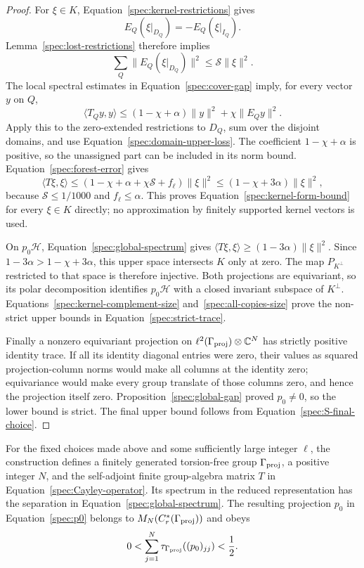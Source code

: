 \begin{proof}
For $\xi\in K$, Equation~\eqref{spec:kernel-restrictions} gives
\[
       E_Q(\xi|_{D_Q})=-E_Q(\xi|_{I_Q}).
\]
Lemma~\ref{spec:lost-restrictions} therefore implies
\begin{equation}
 \sum_Q\|E_Q(\xi|_{D_Q})\|^2\leq\mathcal S\|\xi\|^2.
 \label{spec:domain-upper-loss}
\end{equation}
The local spectral estimates in Equation~\eqref{spec:cover-gap} imply,
for every vector $y$ on $Q$,
\[
 \langle T_Qy,y\rangle
   \leq(1-\chi+\alpha)\|y\|^2+\chi\|E_Qy\|^2.
\]
Apply this to the zero-extended restrictions to $D_Q$, sum over the
disjoint domains, and use Equation~\eqref{spec:domain-upper-loss}.
The coefficient $1-\chi+\alpha$ is positive, so the unassigned part can
be included in its norm bound. Equation~\eqref{spec:forest-error} gives
\[
 \langle T\xi,\xi\rangle
 \leq(1-\chi+\alpha+\chi\mathcal S+f_\ell)\|\xi\|^2
 \leq(1-\chi+3\alpha)\|\xi\|^2,
\]
because $\mathcal S\leq1/1000$ and $f_\ell\leq\alpha$. This proves
Equation~\eqref{spec:kernel-form-bound} for every $\xi\in K$ directly;
no approximation by finitely supported kernel vectors is used.

On $p_0\mathcal H$, Equation~\eqref{spec:global-spectrum} gives
$\langle T\xi,\xi\rangle\geq(1-3\alpha)\|\xi\|^2$.
Since $1-3\alpha>1-\chi+3\alpha$, this upper space intersects $K$
only at zero. The map $P_{K^\perp}$ restricted to that space is
therefore injective. Both projections are equivariant, so its polar
decomposition identifies $p_0\mathcal H$ with a closed invariant
subspace of $K^\perp$. Equations~\eqref{spec:kernel-complement-size}
and~\eqref{spec:all-copies-size} prove the non-strict upper bounds in
Equation~\eqref{spec:strict-trace}.

Finally a nonzero equivariant projection on
$\ell^2(\Gamma_{\mathrm{proj}})\otimes\mathbb C^N$ has strictly positive identity
trace. If all its identity diagonal entries were zero, their values as
squared projection-column norms would make all columns at the identity
zero; equivariance would make every group translate of those columns
zero, and hence the projection itself zero. Proposition~\ref{spec:global-gap}
proved $p_0\ne0$, so the lower bound is strict. The final upper bound
follows from Equation~\eqref{spec:S-final-choice}.
\end{proof}

\begin{theorem}
\label{spec:matrix-projection}
For the fixed choices made above and some sufficiently large integer
$\ell$, the construction defines a finitely generated torsion-free
group $\Gamma_{\mathrm{proj}}$, a positive integer $N$, and the self-adjoint finite
group-algebra matrix $T$ in Equation~\eqref{spec:Cayley-operator}.  Its
spectrum in the reduced representation has the separation in
Equation~\eqref{spec:global-spectrum}.  The resulting projection $p_0$
in Equation~\eqref{spec:p0} belongs to $M_N(C_r^*(\Gamma_{\mathrm{proj}}))$ and obeys
\[
          0<\sum_{j=1}^N\tau_{\Gamma_{\mathrm{proj}}}((p_0)_{jj})<\frac12.
\]
\end{theorem}

